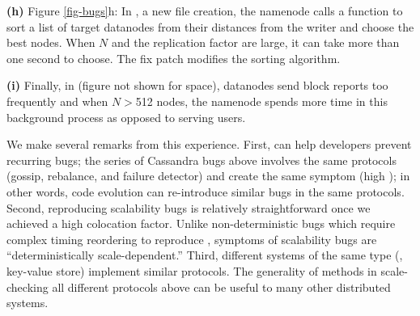 {\bf (h)} Figure \ref{fig-bugs}h: In \hdtri \cite{HDFS-Tri}, a new file creation, the
namenode calls a  function to sort a list of target
datanodes from their distances from the writer and choose the best nodes.
When $N$ and the replication factor are large, it can take more than one
second to choose.  The fix patch modifies the sorting algorithm.


{\bf (i)} Finally, in \hdfour \cite{HDFS-Four} (figure not shown for space),
datanodes send block reports too frequently and when $N$$>$512 nodes, the
namenode spends more time in this background process as opposed to serving
users.







\vfive

We make several remarks from this experience.
%
First, \sck can help developers prevent recurring bugs; the series of
Cassandra bugs above involves the same protocols (gossip, rebalance, and
failure detector) and create the same symptom (high \flaps); in other
words, code evolution can re-introduce similar bugs in the same protocols.
%
Second, reproducing scalability bugs is relatively straightforward once we
achieved a high colocation factor.  Unlike non-deterministic bugs which
require complex timing reordering to reproduce \cite{Guo+11-Demeter,
  Leesatapornwongsa+14-Samc},
symptoms of scalability bugs are ``deterministically scale-dependent.''
%
%
Third, different systems of the same type (\eg, key-value store) implement
similar protocols.  The  generality of \sck methods in scale-checking
all different protocols above can be useful to many other distributed systems.
%






